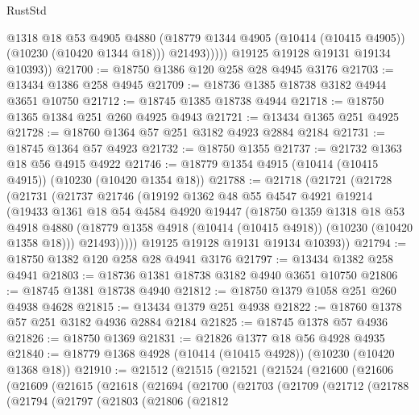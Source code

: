 \begin{lexlean}{RustStd}
\begin{coremodule}
                  @1318
                  @18
                  @53
                  @4905
                  @4880
                  (@18779 @1344 @4905 (@10414 (@10415 @4905)) (@10230 (@10420 @1344 @18)))
                  @21493)))))
        @19125
        @19128
        @19131
        @19134
        @10393))
@21700 := @18750 @1386 @120 @258 @28 @4945 @3176
@21703 := @13434 @1386 @258 @4945
@21709 := @18736 @1385 @18738 @3182 @4944 @3651 @10750
@21712 := @18745 @1385 @18738 @4944
@21718 := @18750 @1365 @1384 @251 @260 @4925 @4943
@21721 := @13434 @1365 @251 @4925
@21728 := @18760 @1364 @57 @251 @3182 @4923 @2884 @2184
@21731 := @18745 @1364 @57 @4923
@21732 := @18750 @1355
@21737 := @21732 @1363 @18 @56 @4915 @4922
@21746 := @18779 @1354 @4915 (@10414 (@10415 @4915)) (@10230 (@10420 @1354 @18))
@21788 := @21718
    (@21721
      (@21728
        (@21731
          (@21737
            @21746
            (@19192
              @1362
              @48
              @55
              @4547
              @4921
              @19214
              (@19433
                @1361
                @18
                @54
                @4584
                @4920
                @19447
                (@18750
                  @1359
                  @1318
                  @18
                  @53
                  @4918
                  @4880
                  (@18779 @1358 @4918 (@10414 (@10415 @4918)) (@10230 (@10420 @1358 @18)))
                  @21493)))))
        @19125
        @19128
        @19131
        @19134
        @10393))
@21794 := @18750 @1382 @120 @258 @28 @4941 @3176
@21797 := @13434 @1382 @258 @4941
@21803 := @18736 @1381 @18738 @3182 @4940 @3651 @10750
@21806 := @18745 @1381 @18738 @4940
@21812 := @18750 @1379 @1058 @251 @260 @4938 @4628
@21815 := @13434 @1379 @251 @4938
@21822 := @18760 @1378 @57 @251 @3182 @4936 @2884 @2184
@21825 := @18745 @1378 @57 @4936
@21826 := @18750 @1369
@21831 := @21826 @1377 @18 @56 @4928 @4935
@21840 := @18779 @1368 @4928 (@10414 (@10415 @4928)) (@10230 (@10420 @1368 @18))
@21910 := @21512
    (@21515
      (@21521
        (@21524
          (@21600
            (@21606
              (@21609
                (@21615
                  (@21618
                    (@21694
                      (@21700
                        (@21703
                          (@21709
                            (@21712
                              (@21788
                                (@21794
                                  (@21797
                                    (@21803
                                      (@21806
                                        (@21812

\end{coremodule}
\end{lexlean}
